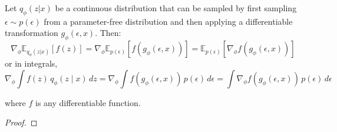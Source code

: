   \begin{theorem}
    Let $q_\phi(z|x)$ be a continuous distribution that can be sampled by first sampling $\epsilon \sim p(\epsilon)$ from a parameter-free distribution and then applying a differentiable transformation $g_\phi(\epsilon, x)$. Then:
    \begin{equation}
       \nabla_\phi \mathbb{E}_{q_\phi(z|x)} [f(z)] = \nabla_\phi \mathbb{E}_{p(\epsilon)} [f(g_\phi(\epsilon, x))] = \mathbb{E}_{p(\epsilon)} [\nabla_\phi f(g_\phi(\epsilon, x))] 
     \end{equation}
    or in integrals, 
    \begin{equation}
     \nabla_\phi \int f(z) \, q_\phi (z \mid x) \,dz = \nabla_\phi \int f(g_\phi (\epsilon, x)) \, p(\epsilon) \,d\epsilon = \int \nabla_\phi f(g_\phi (\epsilon, x)) \, p(\epsilon) \, d\epsilon 
    \end{equation}

    where $f$ is any differentiable function. 
  \end{theorem}
  \begin{proof}
    
  \end{proof}

